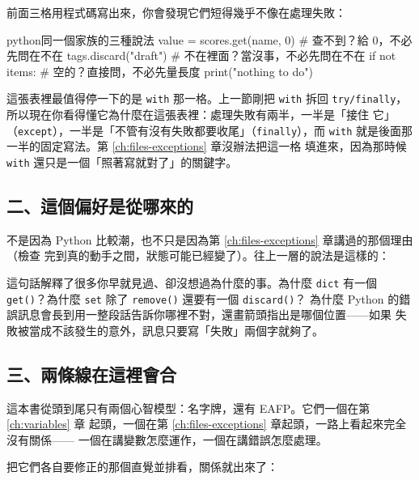 前面三格用程式碼寫出來，你會發現它們短得幾乎不像在處理失敗：

\begin{code}{python}{同一個家族的三種說法}
value = scores.get(name, 0)    # 查不到？給 0，不必先問在不在
tags.discard("draft")          # 不在裡面？當沒事，不必先問在不在
if not items:                  # 空的？直接問，不必先量長度
    print("nothing to do")
\end{code}

這張表裡最值得停一下的是 \texttt{with} 那一格。上一節剛把 \texttt{with} 拆回
\texttt{try/finally}，所以現在你看得懂它為什麼在這張表裡：處理失敗有兩半，一半是「接住
它」（\texttt{except}），一半是「不管有沒有失敗都要收尾」（\texttt{finally}），而
\texttt{with} 就是後面那一半的固定寫法。第 \ref{ch:files-exceptions} 章沒辦法把這一格
填進來，因為那時候 \texttt{with} 還只是一個「照著寫就對了」的關鍵字。

\subsection*{二、這個偏好是從哪來的}

不是因為 Python 比較潮，也不只是因為第 \ref{ch:files-exceptions} 章講過的那個理由（檢查
完到真的動手之間，狀態可能已經變了）。往上一層的說法是這樣的：


這句話解釋了很多你早就見過、卻沒想過為什麼的事。為什麼 \texttt{dict} 有一個
\texttt{get()}？為什麼 \texttt{set} 除了 \texttt{remove()} 還要有一個 \texttt{discard()}？
為什麼 Python 的錯誤訊息會長到用一整段話告訴你哪裡不對，還畫箭頭指出是哪個位置——如果
失敗被當成不該發生的意外，訊息只要寫「失敗」兩個字就夠了。

\subsection*{三、兩條線在這裡會合}

這本書從頭到尾只有兩個心智模型：名字牌，還有 EAFP。它們一個在第 \ref{ch:variables} 章
起頭，一個在第 \ref{ch:files-exceptions} 章起頭，一路上看起來完全沒有關係——
一個在講變數怎麼運作，一個在講錯誤怎麼處理。

把它們各自要修正的那個直覺並排看，關係就出來了：

